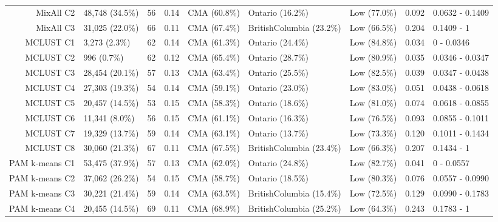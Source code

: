\documentclass[11pt, a4paper]{article}
\begin{document}
\begin{table}[H]
{\begin{tabular}{|r|llllllll|}
  MixAll C2 & 48,748 (34.5\%) & 56 & 0.14 & CMA (60.8\%) & Ontario (16.2\%) & Low (77.0\%) & 0.092 & 0.0632 - 0.1409 \\
  MixAll C3 & 31,025 (22.0\%) & 66 & 0.11 & CMA (67.4\%) & BritishColumbia (23.2\%) & Low (66.5\%) & 0.204 & 0.1409 - 1 \\
\rowcolor{gray!25}  MCLUST C1 & 3,273 (2.3\%) & 62 & 0.14 & CMA (61.3\%) & Ontario (24.4\%) & Low (84.8\%) & 0.034 & 0 - 0.0346 \\
 \rowcolor{gray!25} MCLUST C2 & 996 (0.7\%) & 62 & 0.12 & CMA (65.4\%) & Ontario (28.7\%) & Low (80.9\%) & 0.035 & 0.0346 - 0.0347 \\
\rowcolor{gray!25}  MCLUST C3 & 28,454 (20.1\%) & 57 & 0.13 & CMA (63.4\%) & Ontario (25.5\%) & Low (82.5\%) & 0.039 & 0.0347 - 0.0438 \\
 \rowcolor{gray!25} MCLUST C4 & 27,303 (19.3\%) & 54 & 0.14 & CMA (59.1\%) & Ontario (23.0\%) & Low (83.0\%) & 0.051 & 0.0438 - 0.0618 \\
 \rowcolor{gray!25} MCLUST C5 & 20,457 (14.5\%) & 53 & 0.15 & CMA (58.3\%) & Ontario (18.6\%) & Low (81.0\%) & 0.074 & 0.0618 - 0.0855 \\
 \rowcolor{gray!25} MCLUST C6 & 11,341 (8.0\%) & 56 & 0.15 & CMA (61.1\%) & Ontario (16.3\%) & Low (76.5\%) & 0.093 & 0.0855 - 0.1011 \\
\rowcolor{gray!25}  MCLUST C7 & 19,329 (13.7\%) & 59 & 0.14 & CMA (63.1\%) & Ontario (13.7\%) & Low (73.3\%) & 0.120 & 0.1011 - 0.1434 \\
\rowcolor{gray!25}  MCLUST C8 & 30,060 (21.3\%) & 67 & 0.11 & CMA (67.5\%) & BritishColumbia (23.4\%) & Low (66.3\%) & 0.207 & 0.1434 - 1 \\
  PAM k-means C1 & 53,475 (37.9\%) & 57 & 0.13 & CMA (62.0\%) & Ontario (24.8\%) & Low (82.7\%) & 0.041 & 0 - 0.0557 \\
  PAM k-means C2 & 37,062 (26.2\%) & 54 & 0.15 & CMA (58.7\%) & Ontario (18.5\%) & Low (80.3\%) & 0.076 & 0.0557 - 0.0990 \\
  PAM k-means C3 & 30,221 (21.4\%) & 59 & 0.14 & CMA (63.5\%) & BritishColumbia (15.4\%) & Low (72.5\%) & 0.129 & 0.0990 - 0.1783 \\
  PAM k-means C4 & 20,455 (14.5\%) & 69 & 0.11 & CMA (68.9\%) & BritishColumbia (25.2\%) & Low (64.3\%) & 0.243 & 0.1783 - 1 \\
   \hline
\end{tabular}
}
\end{table}
\end{document}
